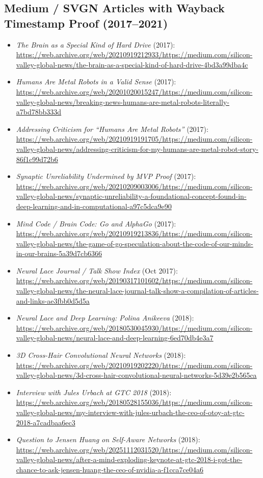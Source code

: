\subsection{Medium / SVGN Articles with Wayback Timestamp Proof (2017--2021)}
\begin{itemize}
  \item \emph{The Brain as a Special Kind of Hard Drive} (2017): \url{https://web.archive.org/web/20210919212933/https://medium.com/silicon-valley-global-news/the-brain-as-a-special-kind-of-hard-drive-4bd3a99dba4c}
  \item \emph{Humans Are Metal Robots in a Valid Sense} (2017): \url{https://web.archive.org/web/20201020015247/https://medium.com/silicon-valley-global-news/breaking-news-humans-are-metal-robots-literally-a7bd78bb333d}
  \item \emph{Addressing Criticism for ``Humans Are Metal Robots''} (2017): \url{https://web.archive.org/web/20210919191705/https://medium.com/silicon-valley-global-news/addressing-criticism-for-my-humans-are-metal-robot-story-86f1c99d72b6}
  \item \emph{Synaptic Unreliability Undermined by MVP Proof} (2017): \url{https://web.archive.org/web/20210209003006/https://medium.com/silicon-valley-global-news/synaptic-unreliability-a-foundational-concept-found-in-deep-learning-and-in-computational-a97c5dca9e90}
  \item \emph{Mind Code / Brain Code: Go and AlphaGo} (2017): \url{https://web.archive.org/web/20210919213836/https://medium.com/silicon-valley-global-news/the-game-of-go-speculation-about-the-code-of-our-minds-in-our-brains-5a39d7cb6366}
  \item \emph{Neural Lace Journal / Talk Show Index} (Oct 2017): \url{https://web.archive.org/web/20190317101602/https://medium.com/silicon-valley-global-news/the-neural-lace-journal-talk-show-a-compilation-of-articles-and-links-ae3fbb0d5d5a}
  \item \emph{Neural Lace and Deep Learning: Polina Anikeeva} (2018): \url{https://web.archive.org/web/20180530045930/https://medium.com/silicon-valley-global-news/neural-lace-and-deep-learning-6ed70db4e3a7}
  \item \emph{3D Cross-Hair Convolutional Neural Networks} (2018): \url{https://web.archive.org/web/20210919202220/https://medium.com/silicon-valley-global-news/3d-cross-hair-convolutional-neural-networks-5d39e2b565ca}
  \item \emph{Interview with Jules Urbach at GTC 2018} (2018): \url{https://web.archive.org/web/20180528155036/https://medium.com/silicon-valley-global-news/my-interview-with-jules-urbach-the-ceo-of-otoy-at-gtc-2018-a7cadbaa6ec3}
  \item \emph{Question to Jensen Huang on Self-Aware Networks} (2018): \url{https://web.archive.org/web/20251112031520/https://medium.com/silicon-valley-global-news/after-a-mind-exploding-keynote-at-gtc-2018-i-got-the-chance-to-ask-jensen-huang-the-ceo-of-nvidia-a-f1cca7ce04a6}
\end{itemize}

